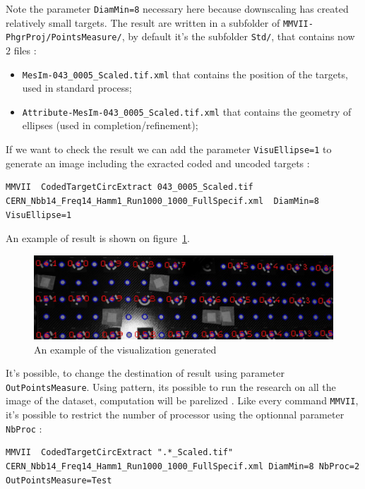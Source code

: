 Note the parameter {\tt DiamMin=8} necessary here because downscaling has created relatively small targets. 
The result are written in a subfolder of {\tt MMVII-PhgrProj/PointsMeasure/}, by default it's the subfolder
{\tt Std/}, that contains now $2$ files :

\begin{itemize}
	\item {\tt MesIm-043\_0005\_Scaled.tif.xml} that contains the position of the targets, used in standard process;
	\item {\tt Attribute-MesIm-043\_0005\_Scaled.tif.xml} that contains the geometry of ellipses (used in completion/refinement);
\end{itemize}


If we want to check the result we can add the parameter {\tt VisuEllipse=1} to generate an image
including the exracted coded and uncoded targets :


\begin{lstlisting}
MMVII  CodedTargetCircExtract 043_0005_Scaled.tif CERN_Nbb14_Freq14_Hamm1_Run1000_1000_FullSpecif.xml  DiamMin=8 VisuEllipse=1
\end{lstlisting}

An example of result is shown on figure~\ref{fig:CodeT:Panel}.

\begin{figure}
\centering
	\includegraphics[width=12 cm]{Tutorial/Images/VisuEllips.jpg}
	\caption{An example of the visualization generated}
\label{fig:CodeT:Panel}
\end{figure}

It's possible, to change the destination of result using parameter {\tt OutPointsMeasure}.
Using pattern, its possible to run the research on all the image of the dataset, computation will be parelized .
Like every command {\tt MMVII}, it's possible to restrict the number of processor using the optionnal parameter
{\tt NbProc} :

\begin{lstlisting}
MMVII  CodedTargetCircExtract ".*_Scaled.tif" CERN_Nbb14_Freq14_Hamm1_Run1000_1000_FullSpecif.xml DiamMin=8 NbProc=2 OutPointsMeasure=Test
\end{lstlisting}


